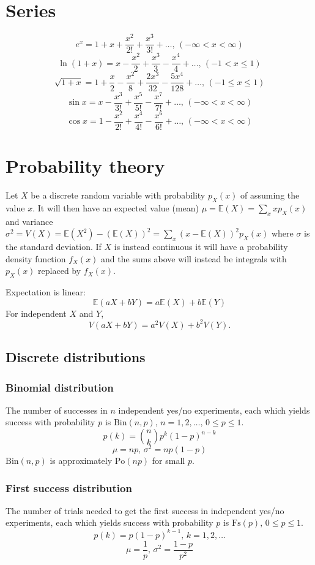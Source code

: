 \section{Series}
$$e^x = 1+x+\frac{x^2}{2!}+\frac{x^3}{3!}+\dots,\,(-\infty<x<\infty)$$
$$\ln(1+x) = x-\frac{x^2}{2}+\frac{x^3}{3}-\frac{x^4}{4}+\dots,\,(-1<x\leq1)$$
$$\sqrt{1+x} = 1+\frac{x}{2}-\frac{x^2}{8}+\frac{2x^3}{32}-\frac{5x^4}{128}+\dots,\,(-1\leq x\leq1)$$
$$\sin x = x-\frac{x^3}{3!}+\frac{x^5}{5!}-\frac{x^7}{7!}+\dots,\,(-\infty<x<\infty)$$
$$\cos x = 1-\frac{x^2}{2!}+\frac{x^4}{4!}-\frac{x^6}{6!}+\dots,\,(-\infty<x<\infty)$$

\section{Probability theory}
Let $X$ be a discrete random variable with probability $p_X(x)$ of assuming the value $x$. It will then have an expected value (mean) $\mu=\mathbb{E}(X)=\sum_xxp_X(x)$ and variance $\sigma^2=V(X)=\mathbb{E}(X^2)-(\mathbb{E}(X))^2=\sum_x(x-\mathbb{E}(X))^2p_X(x)$ where $\sigma$ is the standard deviation. If $X$ is instead continuous it will have a probability density function $f_X(x)$ and the sums above will instead be integrals with $p_X(x)$ replaced by $f_X(x)$.

Expectation is linear:
\[\mathbb{E}(aX+bY) = a\mathbb{E}(X)+b\mathbb{E}(Y)\]
For independent $X$ and $Y$, \[V(aX+bY) = a^2V(X)+b^2V(Y).\]

\subsection{Discrete distributions}

\subsubsection{Binomial distribution}
The number of successes in $n$ independent yes/no experiments, each which yields success with probability $p$ is $\textrm{Bin}(n,p),\,n=1,2,\dots,\, 0\leq p\leq1$.
\[p(k)=\binom{n}{k}p^k(1-p)^{n-k}\]
\[\mu = np,\,\sigma^2=np(1-p)\]
$\textrm{Bin}(n,p)$ is approximately $\textrm{Po}(np)$ for small $p$.

\subsubsection{First success distribution}
The number of trials needed to get the first success in independent yes/no experiments, each which yields success with probability $p$ is $\textrm{Fs}(p),\,0\leq p\leq1$.
\[p(k)=p(1-p)^{k-1},\,k=1,2,\dots\]
\[\mu = \frac1p,\,\sigma^2=\frac{1-p}{p^2}\]

